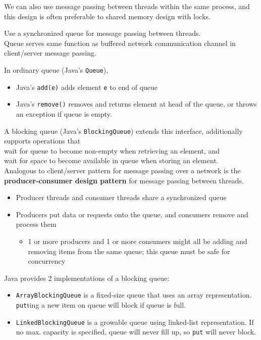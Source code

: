 \documentclass[10pt]{amsart}
\begin{document}
We can also use message passing between threads within the same process, and this design is often preferable to shared memory design with locks.

Use a synchronized queue for message passing between threads. \\
Queue serves same function as buffered network communication channel in client/server message passing.

In ordinary queue (Java's \texttt{Queue}), \\
\begin{itemize}
	\item Java's \texttt{add(e)} adds element \texttt{e} to end of queue
	\item Java's \texttt{remove()} removes and returns element at head of the queue, or throws an exception if queue is empty.
\end{itemize}

A blocking queue (Java's \verb|BlockingQueue|) extends this interface, additionally supports operations that \\
wait for queue to become non-empty when retrieving an element, and \\
wait for space to become available in queue when storing an element. \\

Analogous to client/server pattern for message passing over a network is the \textbf{producer-consumer design pattern} for message passing between threads. 
\begin{itemize} 
	\item Producer threads and consumer threads share a synchronized queue
	\item Producers put data or requests onto the queue, and consumers remove and process them
	\begin{itemize}
		\item 1 or more producers and 1 or more consumers might all be adding and removing items from the same queue; this queue must be safe for concurrency
	\end{itemize}
\end{itemize} 

Java provides 2 implementations of a blocking queue:
\begin{itemize}
	\item \verb|ArrayBlockingQueue| is a fixed-size queue that uses an array representation. \verb|put|ting a new item on queue will block if queue is full.
	\item \verb|LinkedBlockingQueue| is a growable queue using linked-list representation. If no max. capacity is specified, queue will never fill up, so \verb|put| will never block.
\end{itemize}
\end{document}
